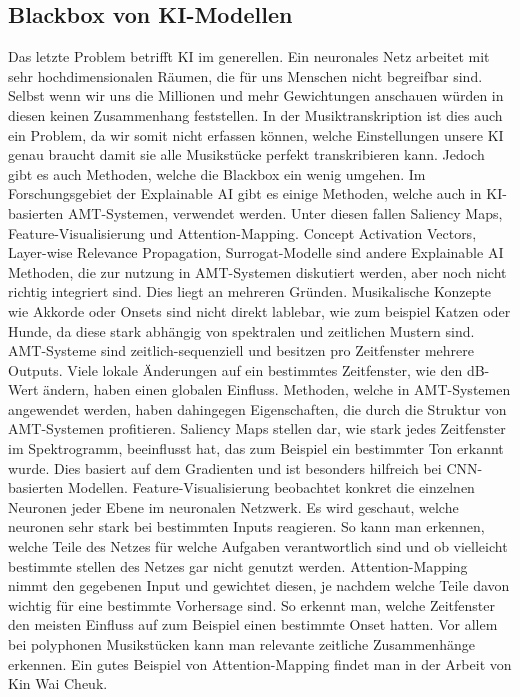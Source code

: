 \subsection{Blackbox von KI-Modellen}
Das letzte Problem betrifft KI im generellen.
Ein neuronales Netz arbeitet mit sehr hochdimensionalen Räumen, die für uns Menschen nicht begreifbar sind.
Selbst wenn wir uns die Millionen und mehr Gewichtungen anschauen würden in diesen keinen Zusammenhang feststellen.
In der Musiktranskription ist dies auch ein Problem, da wir somit nicht erfassen können,
welche Einstellungen unsere KI genau braucht damit sie alle Musikstücke perfekt transkribieren kann.
Jedoch gibt es auch Methoden, welche die Blackbox ein wenig umgehen.
Im Forschungsgebiet der Explainable AI gibt es einige Methoden,
welche auch in KI-basierten AMT-Systemen, verwendet werden.
Unter diesen fallen Saliency Maps, Feature-Visualisierung und Attention-Mapping.
Concept Activation Vectors, Layer-wise Relevance Propagation, Surrogat-Modelle sind andere Explainable AI Methoden,
die zur nutzung in AMT-Systemen diskutiert werden, aber noch nicht richtig integriert sind.
Dies liegt an mehreren Gründen.
Musikalische Konzepte wie Akkorde oder Onsets sind nicht direkt lablebar, wie zum beispiel Katzen oder Hunde,
da diese stark abhängig von spektralen und zeitlichen Mustern sind.
AMT-Systeme sind zeitlich-sequenziell und besitzen pro Zeitfenster mehrere Outputs.
Viele lokale Änderungen auf ein bestimmtes Zeitfenster, wie den dB-Wert ändern, haben einen globalen Einfluss.
Methoden, welche in AMT-Systemen angewendet werden,
haben dahingegen Eigenschaften, die durch die Struktur von AMT-Systemen profitieren.
Saliency Maps stellen dar, wie stark jedes Zeitfenster im Spektrogramm,
beeinflusst hat, das zum Beispiel ein bestimmter Ton erkannt wurde.
Dies basiert auf dem Gradienten und ist besonders hilfreich bei CNN-basierten Modellen.
Feature-Visualisierung beobachtet konkret die einzelnen Neuronen jeder Ebene im neuronalen Netzwerk.
Es wird geschaut, welche neuronen sehr stark bei bestimmten Inputs reagieren.
So kann man erkennen, welche Teile des Netzes für welche Aufgaben verantwortlich sind
und ob vielleicht bestimmte stellen des Netzes gar nicht genutzt werden.
Attention-Mapping nimmt den gegebenen Input und gewichtet diesen,
je nachdem welche Teile davon wichtig für eine bestimmte Vorhersage sind.
So erkennt man, welche Zeitfenster den meisten Einfluss auf zum Beispiel einen bestimmte Onset hatten.
Vor allem bei polyphonen Musikstücken kann man relevante zeitliche Zusammenhänge erkennen.
Ein gutes Beispiel von Attention-Mapping findet man in der Arbeit von Kin Wai Cheuk.
\cite{cheuk2021revisiting}
